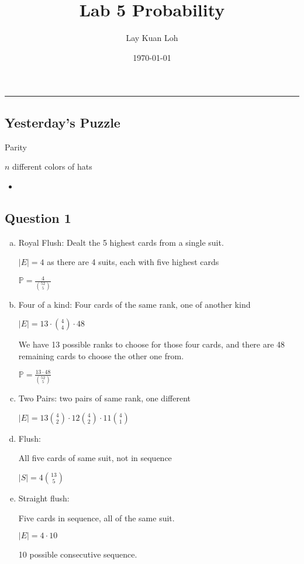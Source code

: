 \documentclass[12pt]{article}
\title{Lab 5 Probability}
\author{Lay Kuan Loh}
\date{\today}
\begin{document}
  \maketitle

  \vspace{-0.3in}
  \rule{\linewidth}{0.4pt}



\subsection{Yesterday's Puzzle}

Parity

$n$ different colors of hats
\begin{itemize}
  \item 
\end{itemize}


\subsection{Question 1}

\begin{enumerate}[(a)]
  \item Royal Flush: Dealt the 5 highest cards from a single suit.
	 
	 $|E| = 4$ as there are 4 suits, each with five highest cards

	 $\displaystyle\mathbb{P} = \frac{4}{\binom{52}{5}}$
  \item Four of a kind: Four cards of the same rank, one of another kind

	 $|E| = 13 \cdot \binom{4}{4} \cdot 48$

	 We have 13 possible ranks to choose for those four cards,
	 and there are 48 remaining cards to choose the other one from.

	 $\displaystyle\mathbb{P} = \frac{13 \cdot 48}{\binom{52}{5}}$
  \item Two Pairs: two pairs of same rank, one different

	 $|E| = 13 \binom{4}{2} \cdot 12 \binom{4}{2} \cdot 11 \binom{4}{1}$ 
  \item Flush:

	 All five cards of same suit, not in sequence

	 $|S| = 4 \binom{13}{5}$
  \item Straight flush:

	 Five cards in sequence, all of the same suit.

	 $|E| = 4 \cdot 10$

	 10 possible consecutive sequence. 
\end{enumerate}
\end{document}
